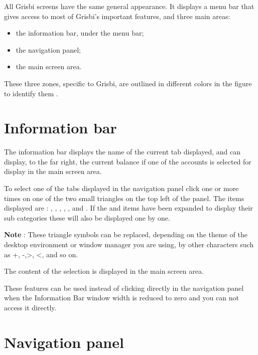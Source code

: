 All Grisbi screens have the same general appearance. It displays a menu bar that gives access to most of Grisbi's important features, and three main areas:

\begin{itemize}
	 \item the information bar, under the menu bar;
	 \item the navigation panel;
	 \item the main screen area.
\end{itemize}

\ifIllustration 
These three zones, specific to Grisbi, are outlined in different colors in the figure to identify them .
\else
\fi

\section{Information bar\label{home-synthesis}}

The information bar displays the name of the current tab displayed, and can display, to the far right, the current balance if one of the accounts is selected for display in the main screen area.


To select one of the tabs displayed in the navigation panel click one or more times on one of the two small triangles on the top left of the panel.  The items displayed are : , , , , ,  and .  If the  and  items have been expanded to display their sub categories these will also be displayed one by one.

\textbf{Note} : These triangle symbols can be replaced, depending on the theme of the desktop environment or window manager you are using, by other characters such as +, -,>, <, and so on.

The content of the selection is displayed in the main screen area.

These features can be used instead of clicking directly in the navigation panel when the Information Bar window width is reduced to zero and you can not access it directly.


\section{Navigation panel\label{home-accounting}}

